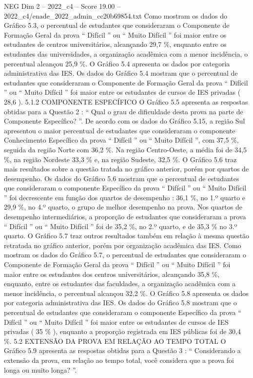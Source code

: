 \begin{textsample}{NEG Dim 2 – 2022\_c4 – Score 19.00 – 2022\_c4/enade\_2022\_admin\_cc20b69854.txt}
Como mostram os dados do Gráfico 5.3, o percentual de estudantes que consideraram o Componente de Formação Geral da prova “ Difícil ” ou “ Muito Difícil ” foi maior entre os estudantes de centros universitários, alcançando 29,7 \%, enquanto entre os estudantes das universidades, a organização acadêmica com a menor incidência, o percentual alcançou 25,9 \%.
O Gráfico 5.4 apresenta os dados por categoria administrativa das IES.
Os dados do Gráfico 5.4 mostram que o percentual de estudantes que consideraram o Componente de Formação Geral da prova “ Difícil ” ou “ Muito Difícil ” foi maior entre os estudantes de cursos de IES privadas ( 28,6 ). 5.1.2 COMPONENTE ESPECÍFICO O Gráfico 5.5 apresenta as respostas obtidas para a Questão 2 : “ Qual o grau de dificuldade desta prova na parte de Componente Específico? ”.
De acordo com os dados do Gráfico 5.15, a região Sul apresentou o maior percentual de estudantes que consideraram o componente Conhecimento Específico da prova “ Difícil ” ou “ Muito Difícil ”, com 37,5 \%, seguida da região Norte com 36,2 \%.
Na região Centro-Oeste, a média foi de 34,5 \%, na região Nordeste 33,3 \% e, na região Sudeste, 32,5 \%.
O Gráfico 5.6 traz mais resultados sobre a questão tratada no gráfico anterior, porém por quartos de desempenho.
Os dados do Gráfico 5.6 mostram que o percentual de estudantes que consideraram o componente Específico da prova “ Difícil ” ou “ Muito Difícil ” foi decrescente em função dos quartos de desempenho : 36,1 \%, no 1.º quarto e 29,9 \%, no 4.º quarto, o grupo de melhor desempenho na prova.
Nos quartos de desempenho intermediários, a proporção de estudantes que consideraram a prova “ Difícil ” ou “ Muito Difícil ” foi de 35,2 \%, no 2.º quarto, e de 35,3 \% no 3.º quarto.
O Gráfico 5.7 traz outros resultados também em relação à mesma questão retratada no gráfico anterior, porém por organização acadêmica das IES.
Como mostram os dados do Gráfico 5.7, o percentual de estudantes que consideraram o Componente de Formação Geral da prova “ Difícil ” ou “ Muito Difícil ” foi maior entre os estudantes dos centros universitários, alcançando 35,8 \%, enquanto, entre os estudantes das faculdades, a organização acadêmica com a menor incidência, o percentual alcançou 32,2 \%.
O Gráfico 5.8 apresenta os dados por categoria administrativa das IES.
Os dados do Gráfico 5.8 mostram que o percentual de estudantes que consideraram o componente Específico da prova “ Difícil ” ou “ Muito Difícil ” foi maior entre os estudantes de cursos de IES privadas ( 35 \% ), enquanto a proporção registrada em IES públicas foi de 30,4 \%. 5.2 EXTENSÃO DA PROVA EM RELAÇÃO AO TEMPO TOTAL O Gráfico 5.9 apresenta as respostas obtidas para a Questão 3 : “ Considerando a extensão da prova, em relação ao tempo total, você considera que a prova foi longa ou muito longa? ”.

\end{textsample}
